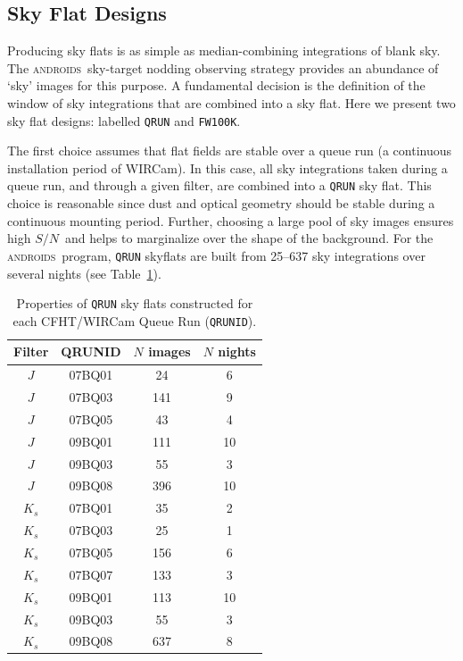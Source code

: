 \documentclass[iop]{emulateapj}
\newcommand{\sn}{\ensuremath{S/N}} %
\newcommand{\androids}{\textsc{androids}}
\newcommand{\Tab}[1]{Table~\ref{tab:#1}}  %
\begin{document}
\subsection{Sky Flat Designs}
\label{sec:flatdesign}

Producing sky flats is as simple as median-combining integrations of blank sky. 
The \androids\ sky-target nodding observing strategy provides an abundance of `sky' images for this purpose.
A fundamental decision is the definition of the window of sky integrations that are combined into a sky flat.
Here we present two sky flat designs: labelled \texttt{QRUN} and \texttt{FW100K}.

The first choice assumes that flat fields are stable over a queue run (a continuous installation period of WIRCam).
In this case, all sky integrations taken during a queue run, and through a given filter, are combined into a \texttt{QRUN} sky flat.
This choice is reasonable since dust and optical geometry should be stable during a continuous mounting period.
Further, choosing a large pool of sky images ensures high \sn\, and helps to marginalize over the shape of the background.
For the \androids\ program, \texttt{QRUN} skyflats are built from 25--637 sky integrations over several nights (see \Tab{qrunflattable}).

\begin{table}[t]
\centering
\caption{Properties of \texttt{QRUN} sky flats constructed for each CFHT/WIRCam Queue Run (\texttt{QRUNID}).}
\label{tab:qrunflattable}

\begin{tabular}{cccc}
\hline
Filter & QRUNID & $N$ images & $N$ nights \\
\hline
$J$ & 07BQ01 & 24 & 6 \\
$J$ & 07BQ03 & 141 & 9 \\
$J$ & 07BQ05 & 43 & 4 \\
$J$ & 09BQ01 & 111 & 10 \\
$J$ & 09BQ03 & 55 & 3 \\
$J$ & 09BQ08 & 396 & 10 \\
\hline
$K_s$ & 07BQ01 & 35 & 2 \\
$K_s$ & 07BQ03 & 25 & 1 \\
$K_s$ & 07BQ05 & 156 & 6 \\
$K_s$ & 07BQ07 & 133 & 3 \\
$K_s$ & 09BQ01 & 113 & 10 \\
$K_s$ & 09BQ03 & 55 & 3 \\
$K_s$ & 09BQ08 & 637 & 8 \\
\hline
\end{tabular}
\end{table}
\end{document}
